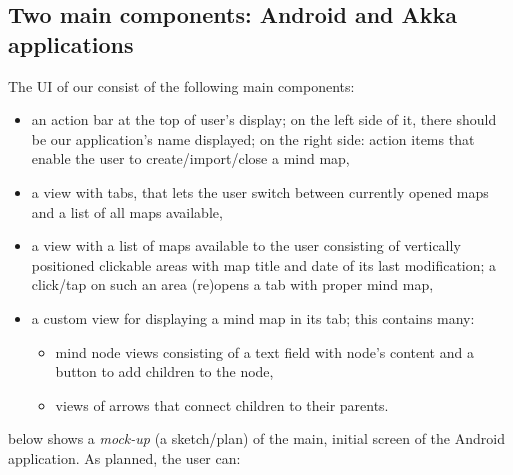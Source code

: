 %
%
%
%
%

\subsection{Two main components: Android and Akka applications}
\label{subsec:component-android}


The UI of our consist of the following main components:

\begin{itemize}
	\item an action bar at the top of user's display; on the left side of it, there should be our application's name displayed; on the right side: action items that enable the user to create/import/close a mind map,
	\item a view with tabs, that lets the user switch between currently opened maps and a list of all maps available,
	\item a view with a list of maps available to the user consisting of vertically positioned clickable areas with map title and date of its last modification; a click/tap on such an area (re)opens a tab with proper mind map,
	\item a custom view for displaying a mind map in its tab; this contains many:\begin{itemize}
		\item mind node views consisting of a text field with node's content and a button to add children to the node,
		\item views of arrows that connect children to their parents.
	\end{itemize}
\end{itemize}

 below shows a \emph{mock-up} (a sketch/plan) of the main, initial screen of the Android application. As planned, the user can:

